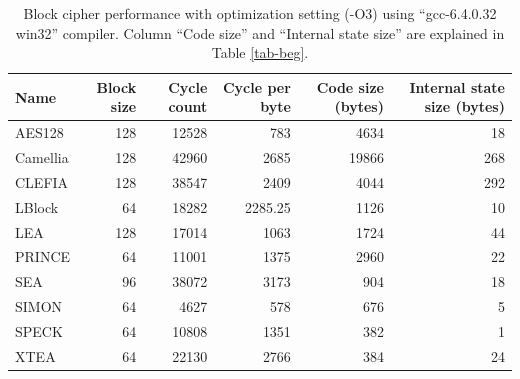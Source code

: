 \documentclass[sigconf, review=false]{acmart}
\begin{document}
\begin{table}[tbp]
\centering
\caption{Block cipher performance with optimization setting (-O3) using ``gcc-6.4.0.32 win32'' compiler.
Column ``Code size'' and ``Internal state size'' are explained in Table \ref{tab-beg}.}
\label{tab-speed}
\begin{tabular}{lrrrrr}
    \toprule
Name     & Block size & Cycle count & Cycle per byte & Code size (bytes) & Internal state size (bytes) \\
    \midrule
AES128   & 128        & 12528       & 783            & 4634      & 18        \\
Camellia & 128        & 42960       & 2685           & 19866     & 268       \\
CLEFIA   & 128        & 38547       & 2409           & 4044      & 292       \\
LBlock   & 64         & 18282       & 2285.25        & 1126      & 10        \\
LEA      & 128        & 17014       & 1063           & 1724      & 44        \\
PRINCE   & 64         & 11001       & 1375           & 2960      & 22        \\
SEA      & 96         & 38072       & 3173           & 904       & 18        \\
SIMON    & 64         & 4627        & 578            & 676       & 5         \\
SPECK    & 64         & 10808       & 1351           & 382       & 1         \\
XTEA     & 64         & 22130       & 2766           & 384       & 24       \\
    \bottomrule
\end{tabular}
\end{table}
\end{document}
